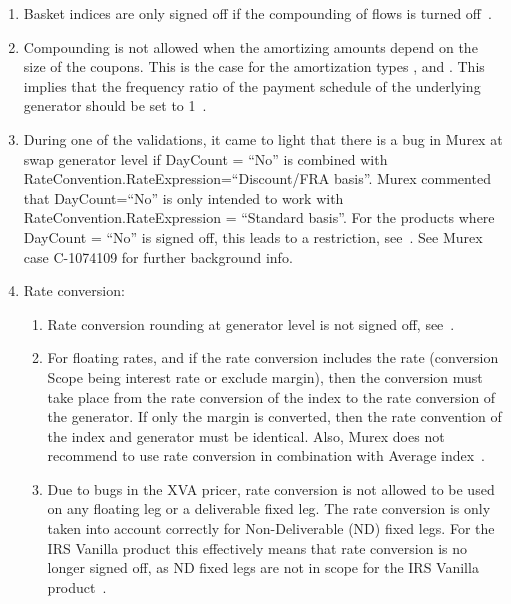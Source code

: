 \documentclass[]{pmv_report} %
\begin{document}
\begin{enumerate}
\begin{enumerate}
	       The reason for this is that Murex does not support this in their xVA engine, see Murex cases C-1053393 and C-1100012 for further background info.
      \end{enumerate}
  \item Basket indices are only signed off if the compounding of flows is turned off~\cite{MxSettings.IRS,MxSettings.IRSGenerator}.
  \item Compounding is not allowed when the amortizing amounts depend on the size of the coupons.
  This is the case for the amortization types ,  and .
  This implies that the frequency ratio of the payment schedule of the underlying generator should be set to 1~\cite{MxSettings.IRS}.
  \item During one of the validations, it came to light that there is a bug in Murex at swap generator level if DayCount = ``No'' is combined with RateConvention.RateExpression=``Discount/FRA basis''.
      Murex commented that DayCount=``No'' is only intended to work with RateConvention.RateExpression = ``Standard basis''.
      For the products where DayCount = ``No'' is signed off, this leads to a restriction, see~\cite{MxSettings.IRSGenerator}.
      See Murex case C-1074109 for further background info.
  \item Rate conversion:
  \begin{enumerate}
    \item Rate conversion rounding at generator level is not signed off, see~\cite{MxSettings.IRSGenerator}.
    \item For floating rates, and if the rate conversion includes the rate (conversion Scope being interest rate or exclude margin), then the conversion must take place from the rate conversion of the index to the rate conversion of the generator.
      If only the margin is converted, then the rate convention of the index and generator must be identical.
      Also, Murex does not recommend to use rate conversion in combination with Average index~\cite{MxSettings.IRSGenerator}.
    \item Due to bugs in the XVA pricer, rate conversion is not allowed to be used on any floating leg or a deliverable fixed leg.
    The rate conversion is only taken into account correctly for Non-Deliverable (ND) fixed legs.
    For the IRS Vanilla product this effectively means that rate conversion is no longer signed off, as ND fixed legs are not in scope for the IRS Vanilla product~\cite{MxSettings.IRSGenerator}.

\end{enumerate}
\end{enumerate}
\end{document}
